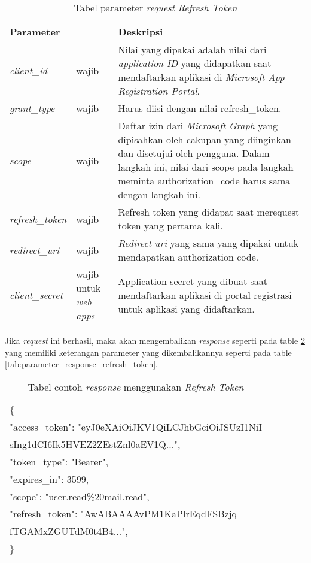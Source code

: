 \documentclass[a4paper,twoside]{article}
\begin{document}
\begin{enumerate}
\begin{table}[H]
	\centering 
	\caption{Tabel parameter \textit{request} \textit{Refresh Token}}
	\label{tab:parameter_request_refresh_token}
	\begin{tabular}{|p{3cm}|p{3cm}|p{9cm}|}
	\hline
	 \textbf{Parameter} & & \textbf{Deskripsi}\\ \hline 
	\textit{client\_id} & wajib & Nilai yang dipakai adalah nilai dari \textit{application ID} yang didapatkan saat mendaftarkan aplikasi di \textit{Microsoft App Registration Portal}.\\ \hline 
	\textit{grant\_type} & wajib & Harus diisi dengan nilai refresh\_token. \\ \hline
	\textit{scope} & wajib & Daftar izin dari \textit{Microsoft Graph} yang dipisahkan oleh cakupan yang diinginkan dan disetujui oleh pengguna. Dalam langkah ini, nilai dari scope pada langkah meminta authorization\_code harus sama dengan langkah ini.  \\ \hline 
	\textit{refresh\_token} & wajib & Refresh token yang didapat saat merequest token yang pertama kali. \\ \hline  
	\textit{redirect\_uri} & wajib & \textit{Redirect uri} yang sama yang dipakai untuk mendapatkan authorization code. \\ \hline 
	\textit{client\_secret} & wajib untuk \textit{web apps} & Application secret yang dibuat saat mendaftarkan aplikasi di portal registrasi untuk aplikasi yang didaftarkan.\\
	\hline
	\end{tabular}  
\end{table}

Jika \textit{request} ini berhasil, maka akan mengembalikan \textit{response} seperti pada table \ref{tab:contoh_response_refresh_token} yang memiliki keterangan parameter yang dikembalikannya seperti pada table \ref{tab:parameter_response_refresh_token}. 
\\
\begin{table}[H]
	\centering 
	\caption{Tabel contoh \textit{response} menggunakan \textit{Refresh Token}}
	\label{tab:contoh_response_refresh_token}
	\begin{tabular}{|p{12cm}|}
	\hline
	\{\\
    "access\_token": "eyJ0eXAiOiJKV1QiLCJhbGciOiJSUzI1NiI\\
    sIng1dCI6Ik5HVEZ2ZEstZnl0aEV1Q...",\\
    "token\_type": "Bearer",\\
    "expires\_in": 3599,\\
    "scope": "user.read\%20mail.read",\\
    "refresh\_token": "AwABAAAAvPM1KaPlrEqdFSBzjq\\
    fTGAMxZGUTdM0t4B4...",\\
\}\\
	\hline
	\end{tabular}  
\end{table}


\end{enumerate}
\end{document}
